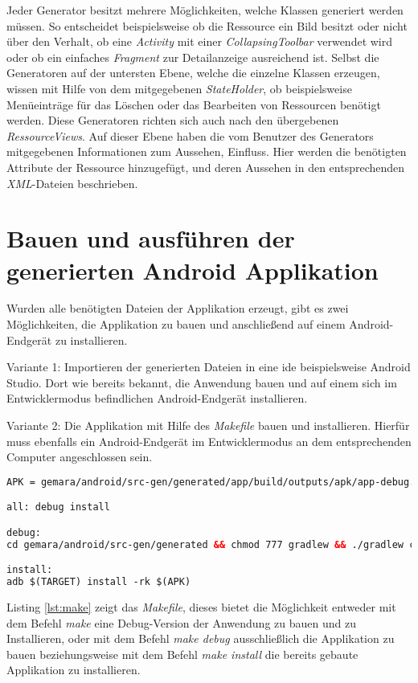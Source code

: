 Jeder Generator besitzt mehrere Möglichkeiten, welche Klassen generiert werden müssen. So entscheidet beispielsweise ob die Ressource ein Bild besitzt oder nicht über den Verhalt, ob eine \textit{Activity} mit einer \textit{CollapsingToolbar} verwendet wird oder ob ein einfaches \textit{Fragment} zur Detailanzeige ausreichend ist.
Selbst die Generatoren auf der untersten Ebene, welche die einzelne Klassen erzeugen, wissen mit Hilfe von dem mitgegebenen \textit{StateHolder}, ob beispielsweise Menüeinträge für das Löschen oder das Bearbeiten von Ressourcen benötigt werden. Diese Generatoren richten sich auch nach den übergebenen \textit{RessourceViews}. Auf dieser Ebene haben die vom Benutzer des Generators mitgegebenen Informationen zum Aussehen, Einfluss. Hier werden die benötigten Attribute der Ressource hinzugefügt, und deren Aussehen in den entsprechenden \textit{XML}-Dateien beschrieben.


\section{Bauen und ausführen der generierten Android Applikation}

Wurden alle benötigten Dateien der Applikation erzeugt, gibt es zwei Möglichkeiten, die Applikation zu bauen und anschließend auf einem Android-Endgerät zu installieren.

Variante 1: Importieren der generierten Dateien in eine \acf{ide} beispielsweise Android Studio. Dort wie bereits bekannt, die Anwendung bauen und auf einem sich im Entwicklermodus befindlichen Android-Endgerät installieren.

Variante 2: Die Applikation mit Hilfe des \textit{Makefile} bauen und installieren. Hierfür muss ebenfalls ein Android-Endgerät im Entwicklermodus an dem entsprechenden Computer angeschlossen sein.

\newpage

\begin{lstlisting}[label=lst:make,
language=xml,
firstnumber=1,
caption=\textit{Makefile} für das Bauen und Installieren der erzeugten Applikation.]				   
APK = gemara/android/src-gen/generated/app/build/outputs/apk/app-debug.apk

all: debug install

debug:
cd gemara/android/src-gen/generated && chmod 777 gradlew && ./gradlew clean assembleDebug

install:
adb $(TARGET) install -rk $(APK)
\end{lstlisting}

Listing \ref{lst:make} zeigt das \textit{Makefile}, dieses bietet die Möglichkeit entweder mit dem Befehl \textit{make} eine Debug-Version der Anwendung zu bauen und zu Installieren, oder mit dem Befehl \textit{make debug} ausschließlich die Applikation zu bauen beziehungsweise mit dem Befehl \textit{make install} die bereits gebaute Applikation zu installieren.
